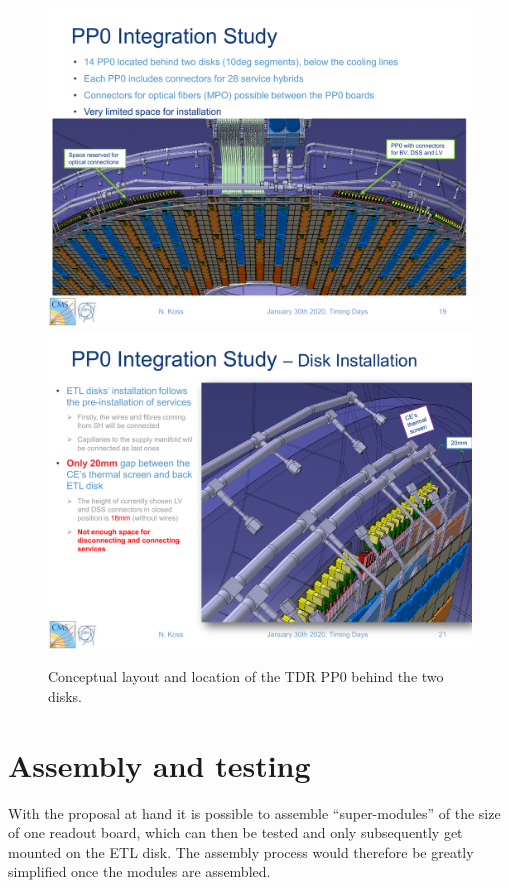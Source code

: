 \documentclass[11pt]{article}
\begin{document}
\begin{figure}[!p]
\centering
\includegraphics[width=.9 \textwidth]{figures/PP0_3D.pdf}\\
\includegraphics[width=.9 \textwidth]{figures/PP0_location.pdf}
\caption{
Conceptual layout and location of the TDR PP0 behind the two disks.
}
\label{fig:PP0_3D}
\end{figure}

\section{Assembly and testing}

With the proposal at hand it is possible to assemble ``super-modules'' of the size of one readout board, which can then be tested and only subsequently get mounted on the ETL disk. The assembly process would therefore be greatly simplified once the modules are assembled.
\end{document}

